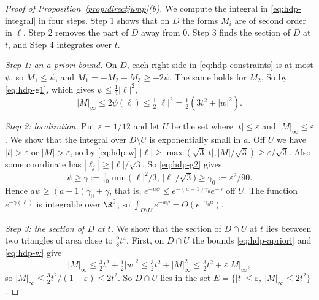 \begin{proof}[Proof of Proposition~\ref{prop:directjump}(b)]
We compute the integral in \eqref{eq:hdp-integral} in four steps. Step 1 shows
that on $D$ the forms $M_i$ are of second order in $\ell$. Step 2 removes the
part of $D$ away from $0$. Step 3 finds the section of $D$ at $t$, and Step 4
integrates over $t$.

\emph{Step 1: an a priori bound.} On $D$, each right side
in \eqref{eq:hdp-constraints} is at most $\psi$, so $M_1\le\psi$, and
$M_1=-M_2-M_3\ge-2\psi$. The same holds for $M_2$. So by \eqref{eq:hdp-g1},
which gives $\psi\le\frac14|\ell|^2$,
\begin{equation}\label{eq:hdp-apriori}
 |M|_\infty\le2\psi(\ell)\le\tfrac12|\ell|^2=\tfrac12(3t^2+|w|^2).
\end{equation}

\emph{Step 2: localization.} Put $\varepsilon=1/12$ and let $U$ be the set
where $|t|\le\varepsilon$ and $|M|_\infty\le\varepsilon$. We show that the
integral over $D\setminus U$ is exponentially small in $a$. Off $U$ we have
$|t|>\varepsilon$ or $|M|>\varepsilon$, so by \eqref{eq:hdp-w}
$|\ell|\ge\max(\sqrt3|t|,|M|/\sqrt3)\ge\varepsilon/\sqrt3$. Also some
coordinate has $|\ell_j|\ge|\ell|/\sqrt3$. So \eqref{eq:hdp-g2} gives
\[
 \psi\ge\gamma:=\tfrac1{10}\min\bigl(|\ell|^2/3,\,|\ell|/\sqrt3\bigr)
 \ge\gamma_0:=\varepsilon^2/90 .
\]
Hence $a\psi\ge(a-1)\gamma_0+\gamma$, that is,
$e^{-a\psi}\le e^{-(a-1)\gamma_0}e^{-\gamma}$ off $U$. The function
$e^{-\gamma(\ell)}$ is integrable over $\R^3$, so
$\int_{D\setminus U}e^{-a\psi}=O(e^{-\gamma_0a})$.

\emph{Step 3: the section of $D$ at $t$.} We show that the section of
$D\cap U$ at $t$ lies between two triangles of area close to $\frac98t^4$.
First, on $D\cap U$ the bounds \eqref{eq:hdp-apriori} and \eqref{eq:hdp-w} give
\[
 |M|_\infty\le\tfrac32t^2+\tfrac12|w|^2\le\tfrac32t^2+|M|_\infty^2
 \le\tfrac32t^2+\varepsilon|M|_\infty,
\]
so $|M|_\infty\le\frac32t^2/(1-\varepsilon)\le2t^2$. So $D\cap U$ lies in the
set $E=\{|t|\le\varepsilon,\ |M|_\infty\le2t^2\}$.


\end{proof}
